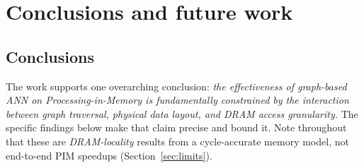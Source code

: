 \documentclass[11pt,a4paper]{article}
\begin{document}
\section{Conclusions and future work}

\subsection{Conclusions}

The work supports one overarching conclusion: \emph{the effectiveness of graph-based ANN on
Processing-in-Memory is fundamentally constrained by the interaction between graph traversal,
physical data layout, and DRAM access granularity.} The specific findings below make that claim
precise and bound it. Note throughout that these are \emph{DRAM-locality} results from a
cycle-accurate memory model, not end-to-end PIM speedups (Section~\ref{sec:limits}).
\end{document}
